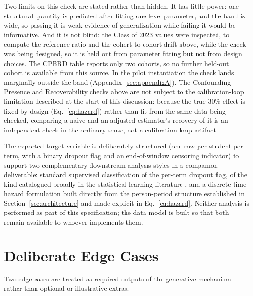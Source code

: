 \documentclass[11pt]{article}
\begin{document}
Two limits on this check are stated rather than hidden. It has little power: one structural quantity is predicted after fitting one level parameter, and the band is wide, so passing it is weak evidence of generalization while failing it would be informative. And it is not blind: the Class of 2023 values were inspected, to compute the reference ratio and the cohort-to-cohort drift above, while the check was being designed, so it is held out from parameter fitting but not from design choices. The CPBRD table reports only two cohorts, so no further held-out cohort is available from this source. In the pilot instantiation the check lands marginally outside the band (Appendix~\ref{sec:appendixA}). The Confounding Presence and Recoverability checks above are not subject to the calibration-loop limitation described at the start of this discussion: because the true 30\% effect is fixed by design (Eq.~\ref{eq:hazard}) rather than fit from the same data being checked, comparing a naive and an adjusted estimator's recovery of it is an independent check in the ordinary sense, not a calibration-loop artifact.

The exported target variable is deliberately structured (one row per student per term, with a binary dropout flag and an end-of-window censoring indicator) to support two complementary downstream analysis styles in a companion deliverable: standard supervised classification of the per-term dropout flag, of the kind catalogued broadly in the statistical-learning literature \citep{james2013}, and a discrete-time hazard formulation built directly from the person-period structure established in Section~\ref{sec:architecture} and made explicit in Eq.~\ref{eq:hazard}. Neither analysis is performed as part of this specification; the data model is built so that both remain available to whoever implements them.


\FloatBarrier
\section{Deliberate Edge Cases}
\label{sec:edgecases}

Two edge cases are treated as required outputs of the generative mechanism rather than optional or illustrative extras.
\end{document}
